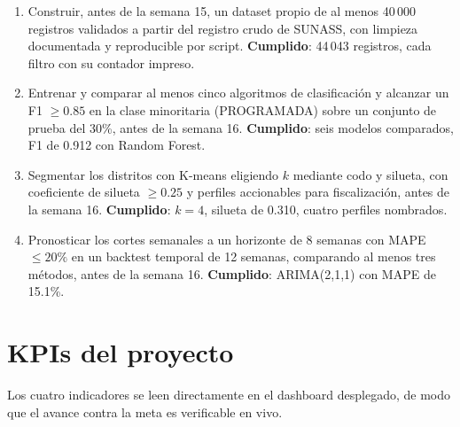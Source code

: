 \documentclass[11pt,a4paper]{article}
\begin{document}
\begin{enumerate}
      \item Construir, antes de la semana 15, un dataset propio de al menos 40\,000
            registros validados a partir del registro crudo de SUNASS, con limpieza
            documentada y reproducible por script. \textbf{Cumplido}: 44\,043
            registros, cada filtro con su contador impreso.
      \item Entrenar y comparar al menos cinco algoritmos de clasificación y alcanzar
            un F1 $\geq 0.85$ en la clase minoritaria (PROGRAMADA) sobre un conjunto
            de prueba del 30\%, antes de la semana 16. \textbf{Cumplido}: seis
            modelos comparados, F1 de 0.912 con Random Forest.
      \item Segmentar los distritos con K-means eligiendo $k$ mediante codo y
            silueta, con coeficiente de silueta $\geq 0.25$ y perfiles accionables
            para fiscalización, antes de la semana 16. \textbf{Cumplido}: $k=4$,
            silueta de 0.310, cuatro perfiles nombrados.
      \item Pronosticar los cortes semanales a un horizonte de 8 semanas con MAPE
            $\leq 20\%$ en un backtest temporal de 12 semanas, comparando al menos
            tres métodos, antes de la semana 16. \textbf{Cumplido}: ARIMA(2,1,1) con
            MAPE de 15.1\%.
\end{enumerate}

\section{KPIs del proyecto}

Los cuatro indicadores se leen directamente en el dashboard desplegado, de modo
que el avance contra la meta es verificable en vivo.
\end{document}
